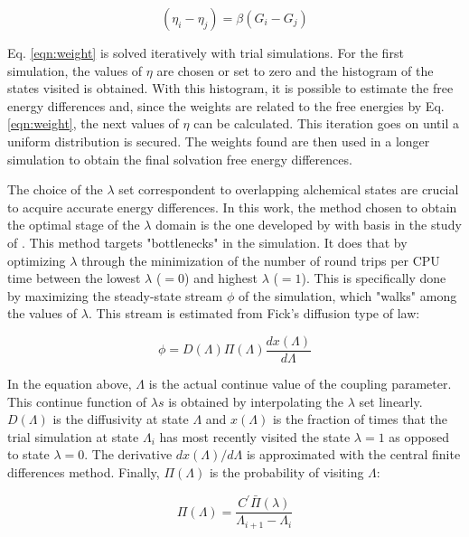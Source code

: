 \begin{equation}
(\eta_{i} - \eta_{j}) = \beta(G_i-G_j)
\label{eqn:weight}
\end{equation}

Eq. \eqref{eqn:weight} is solved iteratively with trial simulations. For the first simulation, the values of $\eta$ are chosen or set to zero and the histogram of the states visited is obtained. With this histogram, it is possible to estimate the free energy differences and, since the weights are related to the free energies by Eq. \eqref{eqn:weight}, the next values of $\eta$ can be calculated. This iteration goes on until a uniform distribution is secured. The weights found are then used in a longer simulation to obtain the final solvation free energy differences.

The choice of the $\lambda$ set correspondent to overlapping alchemical states are crucial to acquire accurate energy differences. In this work, the method chosen to obtain the optimal stage of the $\lambda$ domain is the one developed by  with basis in the study of  . This method targets "bottlenecks" in the simulation. It does that by optimizing $\lambda$ through the minimization of the number of round trips per CPU time between the lowest $\lambda$ ($=0$) and highest $\lambda$ ($=1$). This is specifically done by maximizing the steady-state stream $\phi$ of the simulation, which "walks" among the values of $\lambda$. This stream is estimated from Fick's diffusion type of law:

\begin{equation}
\phi = D(\Lambda) \Pi (\Lambda) \dfrac{dx(\Lambda)}{d \Lambda}
\label{eqn:stream}
\end{equation}

In the equation above, $\Lambda$ is the actual continue value of the coupling parameter. This continue function of $\lambda s$ is obtained by interpolating the $\lambda$ set linearly. $D(\Lambda)$ is the diffusivity at  state $\Lambda$ and $x(\Lambda)$ is the fraction of times that the trial simulation at state $\Lambda_{i}$ has most recently visited the state $\lambda=1$ as opposed to state $\lambda=0$. The derivative ${dx(\Lambda)}/{d \Lambda}$ is approximated with the central finite differences method. Finally, $\Pi (\Lambda)$ is the probability of visiting $\Lambda$:

\begin{equation}
\Pi (\Lambda) = \dfrac{C^{'} \bar{\Pi} (\lambda)}{\Lambda_{i+1} - \Lambda_{i}}
\label{eqn:plambda}
\end{equation}

